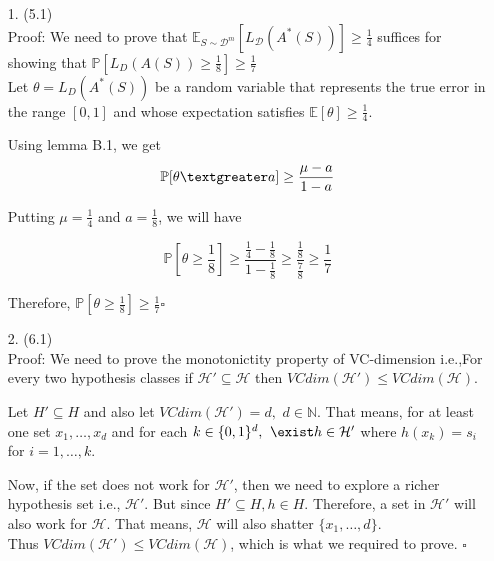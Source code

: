 \documentclass[12pt,letterpaper]{article}
\begin{document}
\begin{enumerate}
	

\item[1.] (5.1)\\
Proof: We need to prove that $\mathbb{E}_{S \sim \mathcal{D}^m}[L_{\mathcal D}(A^*(S))] \ge \frac{1}{4}$ suffices for showing that $\mathbb{P}[L_D(A(S)) \ge \frac{1}{8}] \ge \frac{1}{7}$\\

Let $\theta = L_D(A^*(S))$ be a random variable that represents the true error in the range $[0, 1]$ and whose expectation satisfies $\mathbb{E}[\theta] \ge \frac{1}{4}$.

Using lemma B.1, we get\\
\begin{equation*}
    \mathbb{P}[\theta \textgreater a] \ge \frac{\mu - a}{1 -a}\\
\end{equation*}

Putting $\mu = \frac{1}{4}$ and $a =\frac{1}{8}$, we will have

\begin{equation*}
    \mathbb{P}[\theta \ge \frac{1}{8}] \ge \frac{\frac{1}{4} - \frac{1}{8}}{1 - \frac{1}{8}}
    \ge \frac{\frac{1}{8}}{\frac{7}{8}} \ge \frac{1}{7}
\end{equation*}

Therefore, $\mathbb{P}[\theta \ge \frac{1}{8}] \ge \frac{1}{7} \square$


\vspace{8pt}


\item[2.] (6.1) \\
Proof: We need to prove the monotonictity property of VC-dimension i.e.,For every two hypothesis classes if $\mathcal{H}' \subseteq \mathcal{H}$ then $VCdim(\mathcal{H}') \le VCdim(\mathcal{H})$.

Let $H'\subseteq H$ and also let $VCdim(\mathcal{H}') = d, \hspace{4pt} d\in \mathbb{N}$. That means, for at least one set ${x_1, \dots, x_d}$ and for each $k \in \{0, 1\}^d, \hspace{4pt} \exist h \in \mathcal{H}'$ where $h(x_k) = s_i$ for $i = 1,\dots, k$.

Now, if the set does not work for $\mathcal{H}'$, then we need to explore a richer hypothesis set i.e., $\mathcal{H}'$. 
But since $H' \subseteq H, h \in H$. Therefore, a set in $\mathcal{H}'$ will also work for $\mathcal{H}$. That means, $\mathcal{H}$ will also shatter $\{x_1, \dots, d\}$. \\Thus $VCdim(\mathcal{H}') \le VCdim(\mathcal{H})$, which is what we required to prove. $\square$


\end{enumerate}
\end{document}
